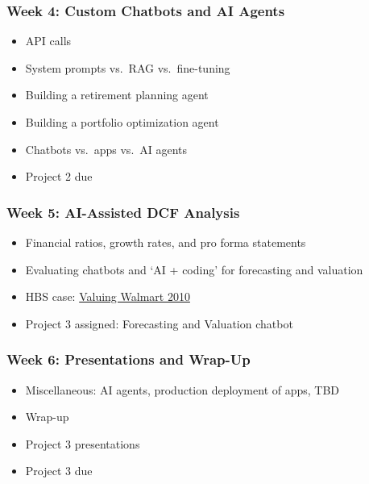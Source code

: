 \documentclass[11pt]{article}
\begin{document}
\subsubsection*{Week 4: Custom Chatbots and AI Agents}
\begin{itemize}\setlength{\itemsep}{0pt}
\item API calls
\item System prompts vs.\ RAG vs.\ fine-tuning
\item Building a retirement planning agent
\item Building a portfolio optimization agent
\item Chatbots vs.\ apps vs.\ AI agents
\item Project 2 due
\end{itemize}

\subsubsection*{Week 5: AI-Assisted DCF Analysis}
\begin{itemize}\setlength{\itemsep}{0pt}
\item Financial ratios, growth rates, and pro forma statements
\item Evaluating chatbots and `AI + coding' for forecasting and valuation
\item HBS case: \href{https://hbsp.harvard.edu/product/W11058-PDF-ENG}{Valuing Walmart 2010}
\item Project 3 assigned: Forecasting and Valuation chatbot
\end{itemize}

\subsubsection*{Week 6: Presentations and Wrap-Up}
\begin{itemize}\setlength{\itemsep}{0pt}
\item Miscellaneous: AI agents, production deployment of apps, TBD
\item Wrap-up
\item Project 3 presentations
\item Project 3 due
\end{itemize}
\end{document}

